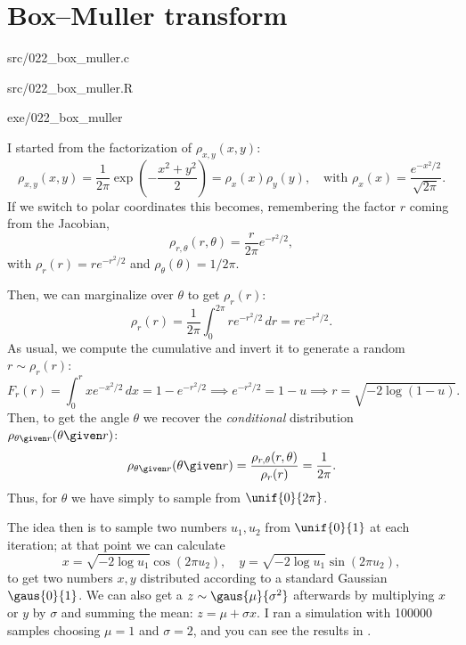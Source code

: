 \section{Box--Muller transform}\label{ex:022}

\begin{sourcefiles}
  \item[Source codes] src/022\_box\_muller.c
  \item[Analysis scripts] src/022\_box\_muller.R
  \item[Executables] exe/022\_box\_muller
\end{sourcefiles} 

I started from the factorization of $\rho_{x, y}(x, y)$:
\begin{equation}
  \rho_{x, y}(x, y) = \frac{1}{2\pi} \exp\left(-\frac{x^{2} + y^{2}}{2}\right) =
  \rho_x(x) \rho_y(y), \quad \text{with } \rho_x(x) =
  \frac{e^{-x^{2}/2}}{\sqrt{2\pi}}.
\end{equation}
If we switch to polar coordinates this becomes, remembering the factor $r$
coming from the Jacobian,
\begin{equation}
  \rho_{r, \theta}(r, \theta) = \frac{r}{2\pi} e^{-r^{2}/2},
\end{equation}
with $\rho_r(r) = r e^{-r^{2}/2}$ and $\rho_\theta(\theta) = 1 / 2\pi$.

Then, we can marginalize over $\theta$ to get $\rho_r(r)$:
\begin{equation}
  \rho_r(r) = \frac{1}{2\pi} \int_{0}^{2\pi} r e^{-r^{2}/2} \, dr = r
  e^{-r^{2}/2}.
\end{equation}
As usual, we compute the cumulative and invert it to generate a random $r \sim
\rho_r(r)$:
\begin{equation}
  F_r(r) = \int_{0}^{r} x e^{-x^{2}/2} \, dx = 1 - e^{-r^{2}/2} \implies
  e^{-r^{2}/2} = 1 - u \implies r = \sqrt{-2 \log(1 - u)}.
\end{equation}
Then, to get the angle $\theta$ we recover the \emph{conditional} distribution
$\rho_{\theta\given r}(\theta \given r)$:
\begin{equation}
  \rho_{\theta\given r}(\theta\given r) = \frac{\rho_{r, \theta}(r,
  \theta)}{\rho_{r}(r)} = \frac{1}{2\pi}.
\end{equation}
Thus, for $\theta$ we have simply to sample from $\unif{0}{2\pi}$.

The idea then is to sample two numbers $u_{1}, u_{2}$ from $\unif{0}{1}$ at each
iteration; at that point we can calculate
\begin{equation}
  x = \sqrt{-2\log u_1} \cos(2\pi u_2), \quad y = \sqrt{-2\log u_1} \sin(2\pi
  u_2),
\end{equation}
to get two numbers $x, y$ distributed according to a standard Gaussian
$\gaus{0}{1}$. We can also get a $z \sim \gaus{\mu}{\sigma^2}$ afterwards by
multiplying $x$ or $y$ by $\sigma$ and summing the mean: $z = \mu + \sigma x$. I
ran a simulation with \num{100000} samples choosing $\mu = 1$ and $\sigma = 2$,
and you can see the results in .

